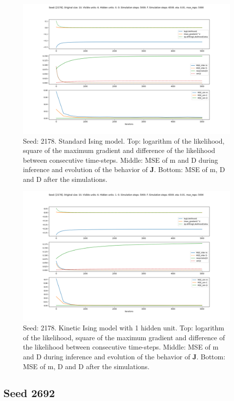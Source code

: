 \documentclass{article}
\def\*#1{\mathbf{#1}}
\begin{document}
\begin{figure}[!htb]
    \centering
    \includegraphics[width=0.7\linewidth]{images/sqrt_size/[2178]_10_6_0_5000_6500_eta001_5000_100.png}
\caption{Seed: 2178. Standard Ising model. Top: logarithm of the likelihood, square of the maximum gradient and difference of the likelihood between consecutive time-steps. Middle: MSE of m and D during inference and evolution of the behavior of $\*J$. Bottom: MSE of m, D and D after the simulations.}
\end{figure}


\begin{figure}[!htb]
    \centering
    \includegraphics[width=0.7\linewidth]{images/sqrt_size/[2178]_10_6_1_5000_6500_eta001_5000_100.png}
\caption{Seed: 2178. Kinetic Ising model with 1 hidden unit. Top: logarithm of the likelihood, square of the maximum gradient and difference of the likelihood between consecutive time-steps. Middle: MSE of m and D during inference and evolution of the behavior of $\*J$. Bottom: MSE of m, D and D after the simulations.}
\end{figure}



\newpage
\subsection{Seed 2692}
\end{document}

